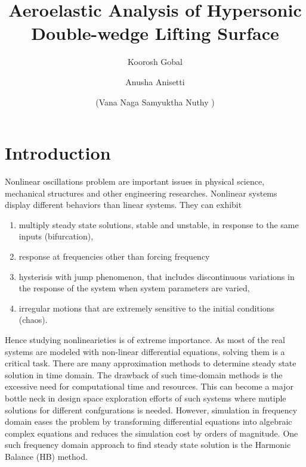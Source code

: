 \documentclass[12pt, a4paper]{extarticle}
\title{Aeroelastic Analysis of Hypersonic Double-wedge Lifting Surface}
\author[1]{Koorosh Gobal}
\author[1]{Anusha Anisetti}
\author[1]{(Vana Naga Samyuktha Nuthy )}
\affil[1]{Department of Mechanical and Materials Engineering, Wright State University}
\date{} %
\begin{document}
\maketitle

\abstract{}
\section{Introduction}
Nonlinear oscillations problem are important issues in physical science, mechanical structures and other engineering researches. Nonlinear systems display different behaviors than linear systems. They can exhibit
\begin{enumerate}  
\item  multiply steady state solutions, stable and unstable, in response to the same inputs (bifurcation),
\item  response at frequencies other than forcing frequency
\item  hysterisis with jump phenomenon, that includes discontinuous variations in the response of the system when system parameters are varied,
\item  irregular motions that are extremely sensitive to the initial conditions (chaos).
\end{enumerate}

Hence studying nonlinearieties is of extreme importance. As most of the real systems are modeled with non-linear differential equations, solving them is a critical task. There are many approximation methods to determine steady state solution in time domain. The drawback of such time-domain methods is the excessive need for computational time and resources. This can become a major bottle neck in design space exploration efforts of such systems where mutiple solutions
for different confgurations is needed. However, simulation in frequency domain eases the problem by transforming differential equations into algebraic complex equations and reduces the simulation cost by orders of magnitude. One such frequency domain approach to find steady state solution is the Harmonic Balance (HB) method.
\end{document}
